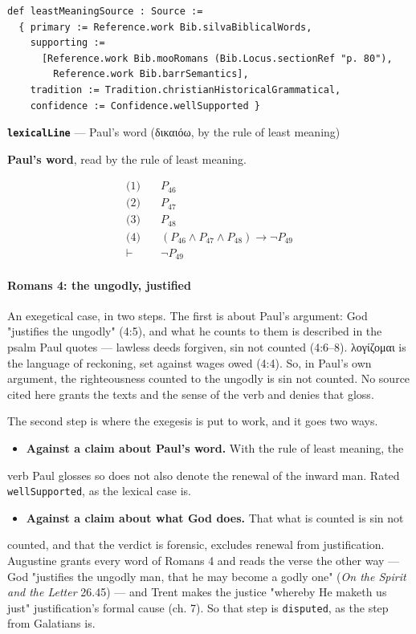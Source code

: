 \documentclass[11pt]{article}
\begin{document}
{\small\begin{verbatim}
def leastMeaningSource : Source :=
  { primary := Reference.work Bib.silvaBiblicalWords,
    supporting :=
      [Reference.work Bib.mooRomans (Bib.Locus.sectionRef "p. 80"),
        Reference.work Bib.barrSemantics],
    tradition := Tradition.christianHistoricalGrammatical,
    confidence := Confidence.wellSupported }
\end{verbatim}}
\par\medskip\noindent\textbf{\texttt{lexical\allowbreak{}Line}} --- Paul's word (δικαιόω, by the rule of least meaning)\par\nobreak\noindent
\textbf{Paul's word}, read by the rule of least meaning.

\begin{align*}
  \text{(1)} \quad & P_{46} \\
  \text{(2)} \quad & P_{47} \\
  \text{(3)} \quad & P_{48} \\
  \text{(4)} \quad & (P_{46} \land P_{47} \land P_{48}) \rightarrow \lnot P_{49} \\
  \vdash \quad & \lnot P_{49}
\end{align*}
\paragraph*{Romans 4: the ungodly, justified}
\leavevmode\par
An exegetical case, in two steps. The first is about Paul's argument: God "justifies the ungodly" (4:5), and what he counts to them is described in the psalm Paul quotes — lawless deeds forgiven, sin not counted (4:6–8). λογίζομαι is the language of reckoning, set against wages owed (4:4). So, in Paul's own argument, the righteousness counted to the ungodly is sin not counted. No source cited here grants the texts and the sense of the verb and denies that gloss.

The second step is where the exegesis is put to work, and it goes two ways.

\begin{itemize}
  \item \textbf{Against a claim about Paul's word.} With the rule of least meaning, the
\end{itemize}
  verb Paul glosses so does not also denote the renewal of the inward man.   Rated \texttt{well\allowbreak{}Supported}, as the lexical case is.

\begin{itemize}
  \item \textbf{Against a claim about what God does.} That what is counted is sin not
\end{itemize}
  counted, and that the verdict is forensic, excludes renewal from   justification. Augustine grants every word of Romans 4 and reads the verse   the other way — God "justifies the ungodly man, that he may become a godly   one" (\emph{On the Spirit and the Letter} 26.45) — and Trent makes the justice   "whereby He maketh us just" justification's formal cause (ch. 7). So that step   is \texttt{disputed}, as the step from Galatians is.
\end{document}
